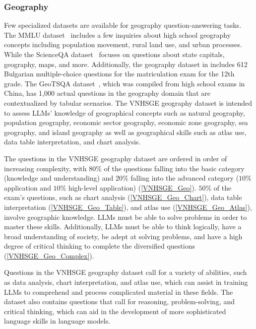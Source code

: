 \documentclass{article}
\begin{document}
{	\subsubsection{Geography}
	
	Few specialized datasets are available for geography question-answering tasks. The MMLU dataset~\cite{hendrycks2020measuring} includes a few inquiries about high school geography concepts including population movement, rural land use, and urban processes. While the ScienceQA dataset~\cite{lu2022learn} focuses on questions about state capitals, geography, maps, and more. Additionally, the geography dataset in \cite{hardalov2019beyond} includes 612 Bulgarian multiple-choice questions for the matriculation exam for the 12th grade. The GeoTSQA dataset~\cite{li2021tsqa}, which was compiled from high school exams in China, has 1,000 actual questions in the geography domain that are contextualized by tabular scenarios. The VNHSGE geography dataset is intended to assess LLMs' knowledge of geographical concepts such as natural geography, population geography, economic sector geography, economic zone geography, sea geography, and island geography as well as geographical skills such as atlas use, data table interpretation, and chart analysis.
	
	The questions in the VNHSGE geography dataset are ordered in order of increasing complexity, with $80\%$  of the questions falling into the basic category (knowledge and understanding) and $20\%$  falling into the advanced category ($10\%$ application and $10\%$  high-level application) (\ref{VNHSGE_Geo}). $50\%$  of the exam's questions, such as chart analysis (\ref{VNHSGE_Geo_Chart}), data table interpretation (\ref{VNHSGE_Geo_Table}), and atlas use (\ref{VNHSGE_Geo_Atlas}), involve geographic knowledge. LLMs must be able to solve problems in order to master these skills. Additionally, LLMs must be able to think logically, have a broad understanding of society, be adept at solving problems, and have a high degree of critical thinking to complete the diversified questions (\ref{VNHSGE_Geo_Complex}). 
	
	Questions in the VNHSGE geography dataset call for a variety of abilities, such as data analysis, chart interpretation, and atlas use, which can assist in training LLMs to comprehend and process complicated material in these fields. The dataset also contains questions that call for reasoning, problem-solving, and critical thinking, which can aid in the development of more sophisticated language skills in language models.
	
}
\end{document}
